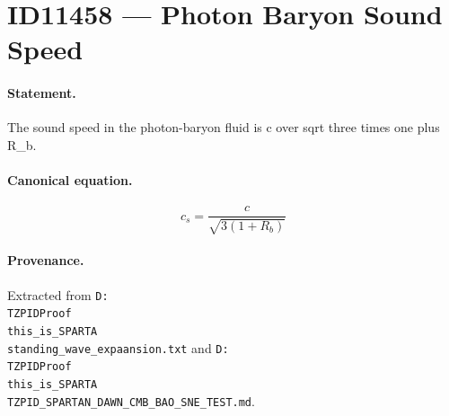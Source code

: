 \section*{ID11458 --- Photon Baryon Sound Speed}

\paragraph{Statement.}
The sound speed in the photon-baryon fluid is c over sqrt three times one plus R_b.

\paragraph{Canonical equation.}
\[
c_s=\frac{c}{\sqrt{3(1+R_b)}}
\]

\paragraph{Provenance.}
Extracted from \texttt{D:\\TZPIDProof\\this\_is\_SPARTA\\standing\_wave\_expaansion.txt} and \texttt{D:\\TZPIDProof\\this\_is\_SPARTA\\TZPID\_SPARTAN\_DAWN\_CMB\_BAO\_SNE\_TEST.md}.
